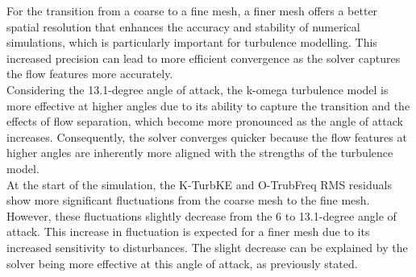 For the transition from a coarse to a fine mesh, a finer mesh offers a better spatial resolution that enhances the accuracy and stability of numerical simulations, which is particularly important for turbulence modelling. This increased precision can lead to more efficient convergence as the solver captures the flow features more accurately. \\

Considering the 13.1-degree angle of attack, the k-omega turbulence model is more effective at higher angles due to its ability to capture the transition and the effects of flow separation, which become more pronounced as the angle of attack increases. Consequently, the solver converges quicker because the flow features at higher angles are inherently more aligned with the strengths of the turbulence model. \\

At the start of the simulation, the K-TurbKE and O-TrubFreq RMS residuals show more significant fluctuations from the coarse mesh to the fine mesh. However, these fluctuations slightly decrease from the 6 to 13.1-degree angle of attack. This increase in fluctuation is expected for a finer mesh due to its increased sensitivity to disturbances. The slight decrease can be explained by the solver being more effective at this angle of attack, as previously stated. \\





